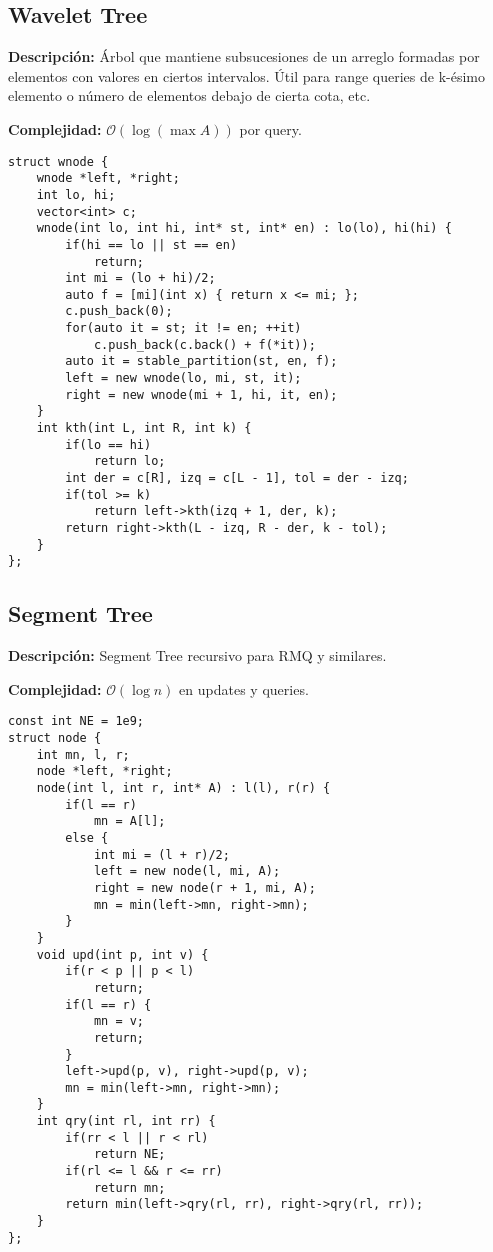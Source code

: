 \documentclass[twocolumn]{article}
\begin{document}
\subsection{Wavelet Tree}
\begin{footnotesize}{\bf Descripción:} Árbol que mantiene subsucesiones de un arreglo formadas por elementos con valores en ciertos intervalos. Útil para range queries de k-ésimo elemento o número de elementos debajo de cierta cota, etc.


{\bf Complejidad:} $\mathcal{O}(\log(\max A))$ por query.
\end{footnotesize}\lstset{basicstyle=\footnotesize\ttfamily,breaklines=true,tabsize=2,language=C++,frame=leftline, numbers=left, numberstyle=\tiny, numbersep=5pt}
\begin{lstlisting}
struct wnode {
	wnode *left, *right;
	int lo, hi;
	vector<int> c;
	wnode(int lo, int hi, int* st, int* en) : lo(lo), hi(hi) {
		if(hi == lo || st == en)
			return;
		int mi = (lo + hi)/2;
		auto f = [mi](int x) { return x <= mi; };
		c.push_back(0);
		for(auto it = st; it != en; ++it)
			c.push_back(c.back() + f(*it));
		auto it = stable_partition(st, en, f);
		left = new wnode(lo, mi, st, it);
		right = new wnode(mi + 1, hi, it, en);
	}
	int kth(int L, int R, int k) {
		if(lo == hi)
			return lo;
		int der = c[R], izq = c[L - 1], tol = der - izq;
		if(tol >= k)
			return left->kth(izq + 1, der, k);
		return right->kth(L - izq, R - der, k - tol);
	}
};
\end{lstlisting}
\subsection{Segment Tree}
\begin{footnotesize}{\bf Descripción:} Segment Tree recursivo para RMQ y similares.


{\bf Complejidad:} $\mathcal{O}(\log n)$ en updates y queries.
\end{footnotesize}\lstset{basicstyle=\footnotesize\ttfamily,breaklines=true,tabsize=2,language=C++,frame=leftline, numbers=left, numberstyle=\tiny, numbersep=5pt}
\begin{lstlisting}
const int NE = 1e9;
struct node {
	int mn, l, r;
	node *left, *right;
	node(int l, int r, int* A) : l(l), r(r) {
		if(l == r)
			mn = A[l];
		else {
			int mi = (l + r)/2;
			left = new node(l, mi, A);
			right = new node(r + 1, mi, A);
			mn = min(left->mn, right->mn);
		}
	}
	void upd(int p, int v) {
		if(r < p || p < l)
			return;
		if(l == r) {
			mn = v;
			return;
		}
		left->upd(p, v), right->upd(p, v);
		mn = min(left->mn, right->mn);
	}
	int qry(int rl, int rr) {
		if(rr < l || r < rl)
			return NE;
		if(rl <= l && r <= rr)
			return mn;
		return min(left->qry(rl, rr), right->qry(rl, rr));
	}
};
\end{lstlisting}
\end{document}
